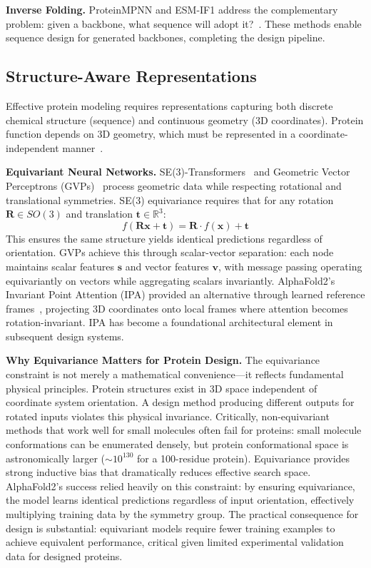\textbf{Inverse Folding.} ProteinMPNN and ESM-IF1 address the complementary problem: given a backbone, what sequence will adopt it?~\cite{dauparas2022proteinmpnn,hsu2022esmif1}. These methods enable sequence design for generated backbones, completing the design pipeline.

\subsection{Structure-Aware Representations}

Effective protein modeling requires representations capturing both discrete chemical structure (sequence) and continuous geometry (3D coordinates). Protein function depends on 3D geometry, which must be represented in a coordinate-independent manner~\cite{fuchs2020se3transformer,jing2021gvp}.

\textbf{Equivariant Neural Networks.} SE(3)-Transformers~\cite{fuchs2020se3transformer} and Geometric Vector Perceptrons (GVPs)~\cite{jing2021gvp} process geometric data while respecting rotational and translational symmetries. SE(3) equivariance requires that for any rotation $\mathbf{R} \in SO(3)$ and translation $\mathbf{t} \in \mathbb{R}^3$:
$$f(\mathbf{R}\mathbf{x} + \mathbf{t}) = \mathbf{R} \cdot f(\mathbf{x}) + \mathbf{t}$$
This ensures the same structure yields identical predictions regardless of orientation. GVPs achieve this through scalar-vector separation: each node maintains scalar features $\mathbf{s}$ and vector features $\mathbf{v}$, with message passing operating equivariantly on vectors while aggregating scalars invariantly. AlphaFold2's Invariant Point Attention (IPA) provided an alternative through learned reference frames~\cite{jumper2021alphafold}, projecting 3D coordinates onto local frames where attention becomes rotation-invariant. IPA has become a foundational architectural element in subsequent design systems.

\textbf{Why Equivariance Matters for Protein Design.} The equivariance constraint is not merely a mathematical convenience---it reflects fundamental physical principles. Protein structures exist in 3D space independent of coordinate system orientation. A design method producing different outputs for rotated inputs violates this physical invariance. Critically, non-equivariant methods that work well for small molecules often fail for proteins: small molecule conformations can be enumerated densely, but protein conformational space is astronomically larger ($\sim 10^{130}$ for a 100-residue protein). Equivariance provides strong inductive bias that dramatically reduces effective search space. AlphaFold2's success relied heavily on this constraint: by ensuring equivariance, the model learns identical predictions regardless of input orientation, effectively multiplying training data by the symmetry group. The practical consequence for design is substantial: equivariant models require fewer training examples to achieve equivalent performance, critical given limited experimental validation data for designed proteins.

